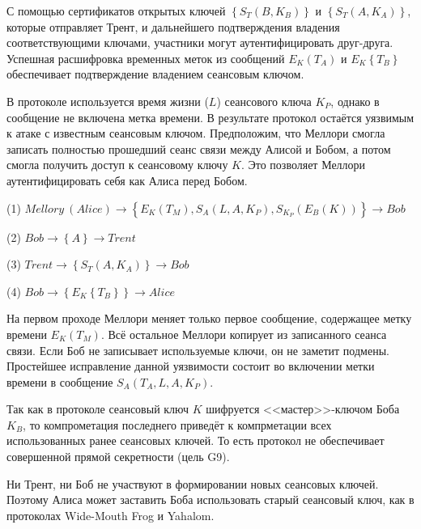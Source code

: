 С помощью сертификатов открытых ключей $\left\{ S_T \left( B, K_B \right) \right\}$ и $\left\{ S_T \left( A, K_A \right) \right\}$, которые отправляет Трент, и дальнейшего подтверждения владения соответствующими ключами, участники могут аутентифицировать друг-друга. Успешная расшифровка временных меток из сообщений $E_K \left( T_A \right)$ и $E_K \left\{ T_B \right\}$ обеспечивает подтверждение владением сеансовым ключом.

В протоколе используется время жизни ($L$) сеансового ключа $K_P$, однако в сообщение не включена метка времени. В результате протокол остаётся уязвимым к атаке с известным сеансовым ключом. Предположим, что Меллори смогла записать полностью прошедший сеанс связи между Алисой и Бобом, а потом смогла получить доступ к сеансовому ключу $K$. Это позволяет Меллори аутентифицировать себя как Алиса перед Бобом.

\begin{protocol}
    \item[(1)] $Mellory~(Alice) \to \left\{ E_K \left( T_M \right), S_A \left( L, A, K_P \right), S_{K_P} \left( E_B \left( K \right) \right) \right\} \to Bob$
    \item[(2)] $Bob \to \left\{ A \right\} \to Trent$
    \item[(3)] $Trent \to \left\{ S_T \left( A, K_A \right) \right\} \to Bob$
    \item[(4)] $Bob \to \left\{ E_K \left\{ T_B \right\} \right\} \to Alice$
\end{protocol}

На первом проходе Меллори меняет только первое сообщение, содержащее метку времени $E_K \left( T_M \right)$. Всё остальное Меллори копирует из записанного сеанса связи. Если Боб не записывает используемые ключи, он не заметит подмены. Простейшее исправление данной уязвимости состоит во включении метки времени в сообщение $S_A \left( T_A, L, A, K_P \right)$.

Так как в протоколе сеансовый ключ $K$ шифруется <<мастер>>-ключом Боба $K_B$, то компрометация последнего приведёт к компрметации всех использованных ранее сеансовых ключей. То есть протокол не обеспечивает совершенной прямой секретности (цель G9).

Ни Трент, ни Боб не участвуют в формировании новых сеансовых ключей. Поэтому Алиса может заставить Боба использовать старый сеансовый ключ, как в протоколах Wide-Mouth Frog и Yahalom.